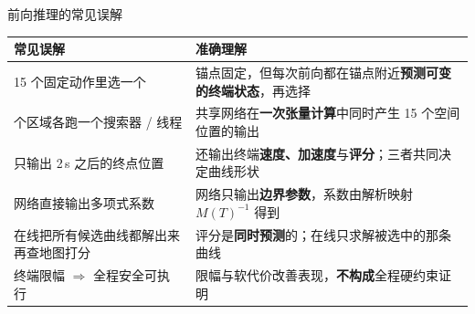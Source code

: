 \begin{frame}{前向推理的常见误解}
  \small
  \begin{center}
  \begin{tabular}{@{}p{}p{}@{}}
    \toprule
    \textbf{常见误解} & \textbf{准确理解} \\
    \midrule
    15 个固定动作里选一个 &
    锚点固定，但每次前向都在锚点附近\textbf{预测可变的终端状态}，再选择 \\
    \addlinespace
    15 个区域各跑一个搜索器 / 线程 &
    共享网络在\textbf{一次张量计算}中同时产生 15 个空间位置的输出 \\
    \addlinespace
    只输出 2\,s 之后的终点位置 &
    还输出终端\textbf{速度、加速度}与\textbf{评分}；三者共同决定曲线形状 \\
    \addlinespace
    网络直接输出多项式系数 &
    网络只输出\textbf{边界参数}，系数由解析映射 $M(T)^{-1}$ 得到 \\
    \addlinespace
    在线把所有候选曲线都解出来再查地图打分 &
    评分是\textbf{同时预测}的；在线只求解被选中的那条曲线 \\
    \addlinespace
    终端限幅 $\Rightarrow$ 全程安全可执行 &
    限幅与软代价改善表现，\textbf{不构成}全程硬约束证明 \\
    \bottomrule
  \end{tabular}
  \end{center}
\end{frame}
